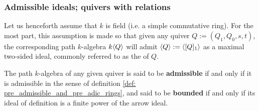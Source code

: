         \subsubsection{Admissible ideals; quivers with relations}
            \begin{convention}
                Let us henceforth assume that $k$ is field (i.e. a simple commutative ring). For the most part, this assumption is made so that given any quiver $Q := (Q_1, Q_0, s, t)$, the corresponding path $k$-algebra $k\langle Q\rangle$ will admit $\langle Q\rangle := \langle[Q]_1\rangle$ as a maximal two-sided ideal, commonly referred to as the  of $Q$.
            \end{convention}
            
            \begin{definition} \label{def: admissible_ideals_of_path_algebras}
                The path $k$-algebra of any given quiver is said to be \textbf{admissible} if and only if it is admissible in the sense of definition \ref{def: pre_admissible_and_pre_adic_rings}, and said to be \textbf{bounded} if and only if its ideal of definition is a finite power of the arrow ideal.
            \end{definition}
            
